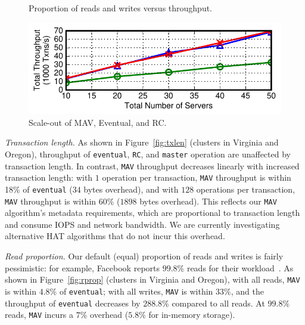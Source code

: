 \begin{figure}[t!]
\caption{Proportion of reads and writes versus throughput.}\vspace{-1em}
\label{fig:rprop}
\begin{center}
\includegraphics[width=\figfactor\columnwidth]{figs/finals/scaleout-thru.pdf}
\end{center}\vspace{-2.25em}
\caption{Scale-out of MAV, Eventual, and RC.}\vspace{-1.5em}
\label{fig:scaleout}
\end{figure}

\vspace{.5em}\noindent\textit{Transaction length.} As shown in
Figure~\ref{fig:txlen} (clusters in Virginia and Oregon), throughput
of \texttt{eventual}, \texttt{RC}, and \texttt{master} operation are
unaffected by transaction length. In contrast, \texttt{MAV} throughput
decreases linearly with increased transaction length: with $1$
operation per transaction, \texttt{MAV} throughput is within 18\% of
\texttt{eventual} ($34$ bytes overhead), and with $128$ operations per
transaction, \texttt{MAV} throughput is within $60\%$ ($1898$ bytes
overhead). This reflects our \texttt{MAV} algorithm's metadata
requirements, which are proportional to transaction length and consume
IOPS and network bandwidth. We are currently investigating alternative
HAT algorithms that do not incur this overhead.

\vspace{.5em}\noindent\textit{Read proportion.} Our default (equal)
proportion of reads and writes is fairly pessimistic: for example,
Facebook reports $99.8\%$ reads for their workload~\cite{eiger}. As
shown in Figure~\ref{fig:rprop} (clusters in Virginia and Oregon),
with all reads, \texttt{MAV} is within $4.8\%$ of \texttt{eventual};
with all writes, \texttt{MAV} is within $33\%$, and the throughput of
\texttt{eventual} decreases by $288.8\%$ compared to all reads. At
$99.8\%$ reads, \texttt{MAV} incurs a $7\%$ overhead ($5.8\%$ for in-memory
storage).

